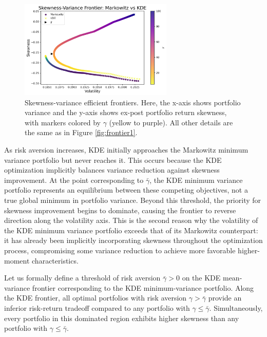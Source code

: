 \vspace{5mm}
\begin{figure}[H]
    \begin{center}
    \begin{minipage}{1\textwidth}
      \centering
      \includegraphics[width=0.65\textwidth]{images/30_2.png}
    \end{minipage}
    \caption[Skewness-variance frontier: Markowitz vs KDE]{Skewness-variance efficient frontiers. Here, the x-axis shows portfolio variance and the y-axis shows ex-post portfolio return skewness, with markers colored by $\gamma$ (yellow to purple). All other details are the same as in Figure \ref{fig:frontier1}.}

    \label{fig:frontier2}
    \end{center}
    \end{figure}

\newpage
As risk aversion increases, KDE initially approaches the Markowitz minimum variance portfolio but never reaches it. This occurs because the KDE optimization implicitly balances variance reduction against skewness improvement. At the point corresponding to $\bar{\gamma}$, the KDE minimum variance portfolio represents an equilibrium between these competing objectives, not a true global minimum in portfolio variance. Beyond this threshold, the priority for skewness improvement begins to dominate, causing the frontier to reverse direction along the volatility axis. This is the second reason why the volatility of the KDE minimum variance portfolio exceeds that of its Markowitz counterpart: it has already been implicitly incorporating skewness throughout the optimization process, compromising some variance reduction to achieve more favorable higher-moment characteristics.

Let us formally define a threshold of risk aversion $\bar{\gamma} > 0$ on the KDE mean-variance frontier corresponding to the KDE minimum-variance portfolio. Along the KDE frontier, all optimal portfolios with risk aversion $\gamma > \bar{\gamma}$ provide an inferior risk-return tradeoff compared to any portfolio with $\gamma \leq \bar{\gamma}$. Simultaneously, every portfolio in this dominated region exhibits higher skewness than any portfolio with $\gamma \leq \bar{\gamma}$. 

